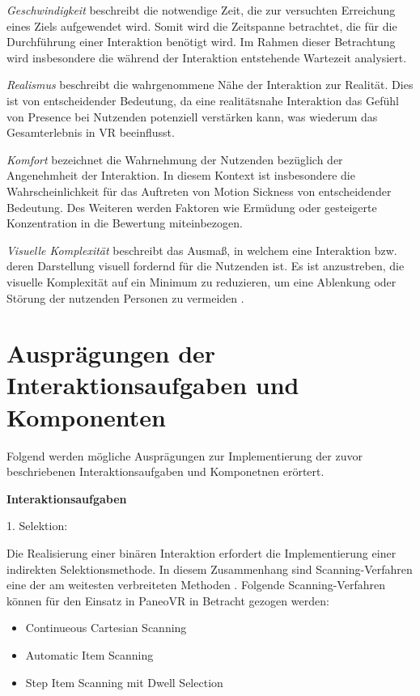 \textit{Geschwindigkeit} beschreibt die notwendige Zeit, die zur versuchten Erreichung eines Ziels aufgewendet wird. Somit wird die Zeitspanne betrachtet, die für die Durchführung einer Interaktion benötigt wird. Im Rahmen dieser Betrachtung wird insbesondere die während der Interaktion entstehende Wartezeit analysiert. 

\textit{Realismus} beschreibt die wahrgenommene Nähe der Interaktion zur Realität. Dies ist von entscheidender Bedeutung, da eine realitätsnahe Interaktion das Gefühl von Presence bei Nutzenden potenziell verstärken kann, was wiederum das Gesamterlebnis in VR beeinflusst.  

\textit{Komfort} bezeichnet die Wahrnehmung der Nutzenden bezüglich der Angenehmheit der Interaktion. In diesem Kontext ist insbesondere die Wahrscheinlichkeit für das Auftreten von Motion Sickness von entscheidender Bedeutung. Des Weiteren werden Faktoren wie Ermüdung oder gesteigerte Konzentration in die Bewertung miteinbezogen.

\textit{Visuelle Komplexität} beschreibt das Ausmaß, in welchem eine Interaktion bzw. deren Darstellung visuell fordernd für die Nutzenden ist. Es ist anzustreben, die visuelle Komplexität auf ein Minimum zu reduzieren, um eine Ablenkung oder Störung der nutzenden Personen zu vermeiden \citep{steriadis_designing_2003}. 

\section{Ausprägungen der Interaktionsaufgaben und Komponenten}

Folgend werden mögliche Ausprägungen zur Implementierung der zuvor beschriebenen Interaktionsaufgaben und Komponetnen erörtert.

{\normalfont \bfseries Interaktionsaufgaben}  

1. Selektion: 

Die Realisierung einer binären Interaktion erfordert die Implementierung einer indirekten Selektionsmethode. In diesem Zusammenhang sind Scanning-Verfahren eine der am weitesten verbreiteten Methoden \citep{COOK2015117}. Folgende Scanning-Verfahren können für den Einsatz in PaneoVR in Betracht gezogen werden: 

\begin{itemize}
    \item Continueous Cartesian Scanning 
    \item Automatic Item Scanning
    \item Step Item Scanning mit Dwell Selection 
\end{itemize}

